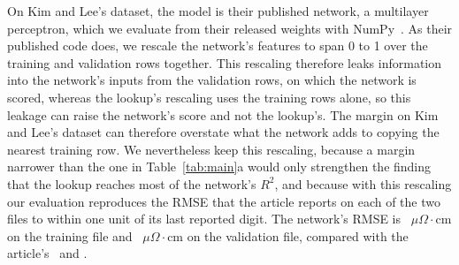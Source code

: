 \documentclass[11pt]{article}
\begin{document}
On Kim and Lee's dataset, the model is their published network, a multilayer
perceptron\cite{rumelhart1986backprop}, which we evaluate from their released weights with
NumPy~\numpyVersion.\cite{harris2020numpy} As their published code does, we
rescale the network's features to span 0 to 1 over the training and validation
rows together.\cite{kim2025descriptors} This rescaling therefore leaks
information into the network's inputs from the validation rows, on which the
network is scored, whereas the lookup's rescaling uses the training rows alone,
so this leakage can raise the network's score and not the lookup's. The margin on Kim and
Lee's dataset can therefore overstate what the network adds to copying the
nearest training row. We nevertheless keep this rescaling, because a margin
narrower than the one in Table~\ref{tab:main}a would only strengthen the
finding that the lookup reaches most of the network's $R^2$, and because with this rescaling our evaluation reproduces
the RMSE that the article reports on each of the two files to within one unit
of its last reported digit. The network's RMSE
is \npjModelTrainRmse~$\mu\Omega\cdot$cm on the training file and
\npjModelRmse~$\mu\Omega\cdot$cm on the validation file, compared with the
article's \npjPaperTrainRmse\ and \npjPaperRmse.
\end{document}
